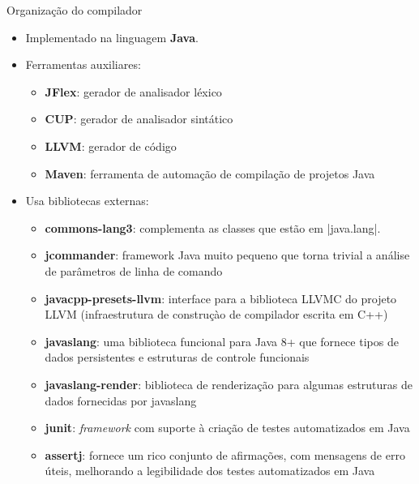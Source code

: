\begin{frame}{Organização do compilador}
  \begin{itemize}
    \item Implementado na linguagem \textbf{Java}.
    \item Ferramentas auxiliares:
    \begin{itemize}
      \item \textbf{JFlex}: gerador de analisador léxico
      \item \textbf{CUP}: gerador de analisador sintático
      \item \textbf{LLVM}: gerador de código
      \item \textbf{Maven}: ferramenta de automação de compilação de
      projetos Java
    \end{itemize}
    \item Usa bibliotecas externas:
    \begin{itemize}
      \item \textbf{commons-lang3}: complementa as classes que estão
      em \pyginline|java.lang|.
      
      \item \textbf{jcommander}: framework Java muito pequeno que
      torna trivial a análise de parâmetros de linha de comando
      
      \item \textbf{javacpp-presets-llvm}: interface para a biblioteca
      LLVMC do projeto LLVM (infraestrutura de construçào de
      compilador escrita em C++)      
      
      \item \textbf{javaslang}: uma biblioteca funcional para Java 8+ que
      fornece tipos de dados persistentes e estruturas de controle
      funcionais

      \item \textbf{javaslang-render}: biblioteca de renderização para
      algumas estruturas de dados fornecidas por javaslang

      \item \textbf{junit}: \emph{framework} com suporte à criação de testes
      automatizados em Java

      \item \textbf{assertj}: fornece um rico conjunto de afirmações, com
      mensagens de erro úteis, melhorando a legibilidade dos testes
      automatizados em Java
    \end{itemize}
  \end{itemize}
\end{frame}

